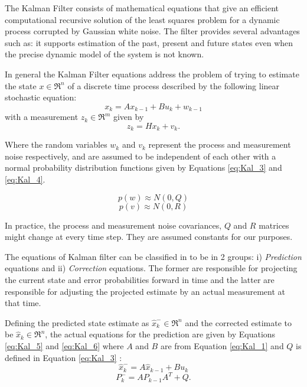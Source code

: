 The Kalman Filter \cite{Kalman1960, WelchandBishop1995} consists of mathematical equations that give an efficient computational recursive solution of the least squares problem for a dynamic process corrupted by Gaussian white noise. The filter provides several advantages such as: it supports estimation of the past, present and future states even when the precise dynamic model of the system is not known.

In general the Kalman Filter equations address the problem of trying to estimate the state $ x \in \Re^n $ of a discrete time process described by the following linear stochastic equation:
\begin{equation}
\label{eq:Kal_1}
x_k = Ax_{k-1} + Bu_k + w_{k-1}
\end{equation}
with a measurement $ z_k \in \Re^m $ given by
\begin{equation}
\label{eq:Kal_2}
z_k=Hx_k+v_k.
\end{equation}

Where the random variables $ w_k $ and $ v_k$ represent the process and measurement noise respectively, and are assumed to be independent of each other with a normal probability distribution functions given by Equations \ref{eq:Kal_3} and \ref{eq:Kal_4}.

\begin{equation}
\label{eq:Kal_3}
p(w)\approx N(0,Q)
\end{equation} 
\begin{equation}
\label{eq:Kal_4}
p(v) \approx N(0,R)
\end{equation}

In practice, the process and measurement noise covariances, $ Q $ and $ R $ matrices might change at every time step. They are assumed constants for our purposes. 

The equations of Kalman filter can be classified in to be in 2 groups: i) \textit{Prediction} equations and ii) \textit{Correction} equations. The former are responsible for projecting the current state and error probabilities forward in time and the latter are responsible for adjusting the projected estimate by an actual measurement at that time. 

Defining the predicted state estimate as $ \hat{x}^-_k \in \Re^n $ and the corrected estimate to be $ \hat{x}_k \in \Re^n $, the actual equations for the prediction are given by Equations \ref{eq:Kal_5} and \ref{eq:Kal_6} where $ A $ and $ B $ are from Equation \ref{eq:Kal_1} and $ Q $ is defined in Equation \ref{eq:Kal_3} \cite{WelchandBishop1995}:
\begin{equation}
\label{eq:Kal_5}
\hat{x}^-_k = A\hat{x}_{k-1}+Bu_k
\end{equation}
\begin{equation}
\label{eq:Kal_6}
P^-_k = AP_{k-1}A^T+Q.
\end{equation}

